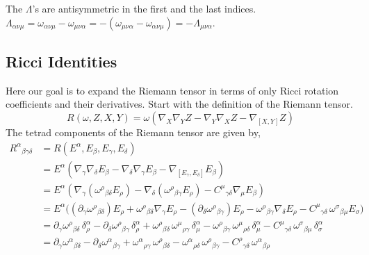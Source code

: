 The $ \Lambda$'s are antisymmetric in the first and the last indices. $ \Lambda_{\alpha\nu\mu} = \omega_{\alpha\nu\mu} - \omega_{\mu\nu\alpha} = -\left( \omega_{\mu\nu\alpha} - \omega_{\alpha\nu\mu} \right) = -\Lambda_{\mu\nu\alpha}$.


\subsection{Ricci Identities}

Here our goal is to expand the Riemann tensor in terms of only Ricci rotation coefficients and their derivatives. Start with the definition of the Riemann tensor.  
\[
R(\omega, Z, X, Y) = \omega\left( \nabla_X \nabla_Y Z - \nabla_Y \nabla_X Z - \nabla_{[X,Y]} Z \right)
\]
The tetrad components of the Riemann tensor are given by,
\begin{align*}
R^{\alpha}{}_{\beta\gamma\delta} &= R\left( E^\alpha, E_\beta, E_\gamma, E_\delta \right) \\
&= E^\alpha\left( \nabla_\gamma \nabla_\delta E_\beta - \nabla_\delta \nabla_\gamma E_\beta - \nabla_{[E_\gamma, E_\delta]} E_\beta \right) \\
&= E^\alpha\left( \nabla_\gamma\left( \omega^{\rho}{}_{\beta\delta} E_\rho \right) - \nabla_\delta\left( \omega^{\rho}{}_{\beta\gamma} E_\rho \right) - C^{\mu}{}_{\gamma\delta} \nabla_\mu E_\beta \right)  \\
&= E^\alpha\Big( \left( \partial_\gamma \omega^{\rho}{}_{\beta\delta} \right) E_\rho + \omega^{\rho}{}_{\beta\delta} \nabla_\gamma E_\rho - \left( \partial_\delta \omega^{\rho}{}_{\beta\gamma} \right) E_\rho  - \omega^{\rho}{}_{\beta\gamma} \nabla_\delta E_\rho - C^{\mu}{}_{\gamma\delta}\, \omega^{\sigma}{}_{\beta\mu} E_\sigma \Big) \\
&= \partial_\gamma \omega^{\rho}{}_{\beta\delta}\, \delta^{\alpha}_{\rho} - \partial_\delta \omega^{\rho}{}_{\beta\gamma}\, \delta^{\alpha}_{\rho} + \omega^{\rho}{}_{\beta\delta}\, \omega^{\mu}{}_{\rho\gamma}\, \delta^{\alpha}_{\mu}  - \omega^{\rho}{}_{\beta\gamma}\, \omega^{\mu}{}_{\rho\delta}\, \delta^{\alpha}_{\mu} - C^{\mu}{}_{\gamma\delta}\, \omega^{\sigma}{}_{\beta\mu}\, \delta^{\alpha}_{\sigma} \\
&= \partial_\gamma \omega^{\alpha}{}_{\beta\delta} - \partial_\delta \omega^{\alpha}{}_{\beta\gamma} + \omega^{\alpha}{}_{\rho\gamma}\, \omega^{\rho}{}_{\beta\delta} - \omega^{\alpha}{}_{\rho\delta}\, \omega^{\rho}{}_{\beta\gamma} - C^{\rho}{}_{\gamma\delta}\, \omega^{\alpha}{}_{\beta\rho} \\

\end{align*}
